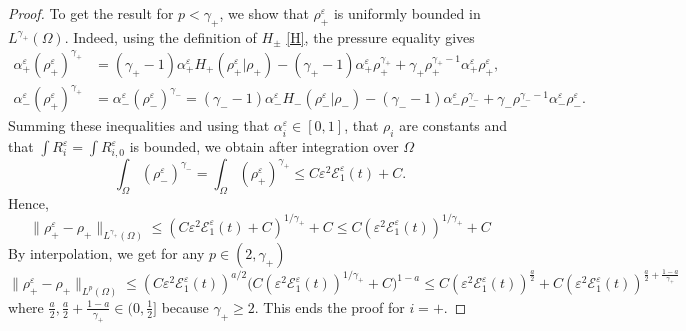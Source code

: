 \documentclass[11pt, twoside, a4paper]{article}
\theoremstyle{plain}
\theoremstyle{remark}
\numberwithin{equation}{section}
\def\EE{{\mathcal E}}
\renewcommand{\leq}{\leqslant}\renewcommand{\le}{\leqslant}
\renewcommand{\geq}{\geqslant}\renewcommand{\ge}{\geqslant}
\newcommand{\eps}{\varepsilon}
\newcommand{\ap}{\alpha_+}
\newcommand{\am}{\alpha_-}
\newcommand{\rp}{\rho_+}
\newcommand{\rmi}{\rho_-}
\newcommand{\gp}{\gamma_{+}}
\newcommand{\gm}{\gamma_-}
\begin{document}
\begin{proof}
To get the result for $p<\gamma_+$, we show that $\rp^\eps$ is uniformly bounded in $L^{\gp}(\Omega)$. Indeed, using the definition of $H_\pm$ \eqref{H}, the pressure equality gives
\begin{align*}
 \ap^\eps (\rp^\eps)^{\gp} &= (\gp-1) \ap^\eps H_+(\rp^\eps | \rp) -(\gp-1) \ap^\eps \rp^{\gp} + \gp \rp^{\gp-1} \ap^\eps \rp^\eps,\\
 \am^\eps (\rp^\eps)^{\gp} &= \am^\eps (\rmi^\eps)^{\gm} = (\gm-1) \am^\eps H_-(\rmi^\eps | \rmi) -(\gamma_--1) \am^\eps \rmi^{\gm} + \gm \rmi^{\gm-1} \am^\eps \rmi^\eps.
\end{align*}
Summing these inequalities and using that $\alpha_i^\eps \in [0,1]$, that $\rho_i$ are constants and that $\int R_i^\eps=\int R_{i,0}^\eps$ is bounded, we obtain after integration over $\Omega$
\begin{equation}\label{est.rhoLgamma}
\int_\Omega (\rmi^\eps)^{\gm} = \int_\Omega (\rp^\eps)^{\gp} \leq C \eps^2 \EE_1^\eps(t) + C. 
\end{equation}
Hence,
\[
\|\rp^\eps - \rp\|_{L^{\gamma_+}(\Omega)} \leq (C \eps^2 \EE_1^\eps(t) + C)^{1/\gamma_+} +C \leq C (\eps^2 \EE_1^\eps(t))^{1/\gamma_+} +C
\]
By interpolation, we get for any $p\in (2,\gamma_+)$
\[
\|\rp^\eps - \rp\|_{L^{p}(\Omega)} \leq (C\eps^2 \EE_1^\eps(t))^{a/2} \Big(C (\eps^2 \EE_1^\eps(t))^{1/\gamma_+} +C\Big)^{1-a} \leq C(\eps^2 \EE_1^\eps(t))^{\frac{a}2} + C(\eps^2 \EE_1^\eps(t))^{\frac{a}2+\frac{1-a}{\gamma_+} }
\]
where $\frac{a}2,\frac{a}2+\frac{1-a}{\gamma_+} \in (0,\frac{1}2]$ because $\gamma_+ \geq 2$. This ends the proof for $i=+$.



\end{proof}
\end{document}
